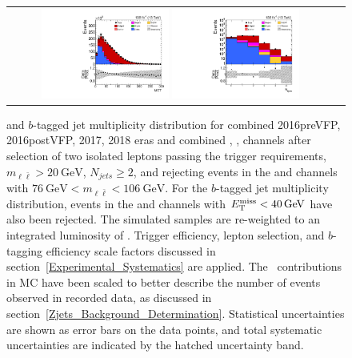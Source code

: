 \begin{figure}[htb]
    \begin{center}
        \begin{tabular}{cc}
            \includegraphics[width=0.40\textwidth]{fig_fullRun2UL/controlplots/combined/MET_preMETcut.pdf}
            \includegraphics[width=0.40\textwidth]{fig_fullRun2UL/controlplots/combined/HypBjetMulti_noBTag.pdf}
        \end{tabular}
        \caption{\footnotesize \ETmiss and $b$-tagged jet multiplicity distribution for combined 2016preVFP, 2016postVFP, 2017, 2018 eras and combined \ee, \emu, \mumu channels after selection of two isolated leptons passing the trigger requirements, $m_{\ell\bar{\ell}} > \SI{20}{\GeV}$, $N_{jets} \geq 2$, and rejecting events in the \ee and \mumu channels with $\SI{76}{\GeV} < m_{\ell\bar{\ell}} < \SI{106}{\GeV}$.
        For the $b$-tagged jet multiplicity distribution, events in the \ee and \mumu channels with $\ETmiss < \SI{40}{\GeV}$ have also been rejected.
        The simulated samples are re-weighted to an integrated luminosity of \lumivalueRuniiUL.
        Trigger efficiency, lepton selection, and $b$-tagging efficiency scale factors discussed in section~\ref{Experimental_Systematics} are applied.
        The \zjets\ contributions in MC have been scaled to better describe the number of events observed in recorded data, as discussed in section~\ref{Zjets_Background_Determination}.
        Statistical uncertainties are shown as error bars on the data points, and total systematic uncertainties are indicated by the hatched uncertainty band.        
        }
    \end{center}
\end{figure}

